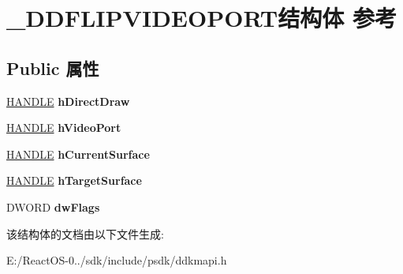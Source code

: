 \hypertarget{struct___d_d_f_l_i_p_v_i_d_e_o_p_o_r_t}{}\section{\+\_\+\+D\+D\+F\+L\+I\+P\+V\+I\+D\+E\+O\+P\+O\+R\+T结构体 参考}
\label{struct___d_d_f_l_i_p_v_i_d_e_o_p_o_r_t}
\subsection*{Public 属性}
\begin{DoxyCompactItemize}
\item 
\mbox{\label{struct___d_d_f_l_i_p_v_i_d_e_o_p_o_r_t_a7405e65bf36679f623654d12df12e3cd}} 
\hyperlink{interfacevoid}{H\+A\+N\+D\+LE} {\bfseries h\+Direct\+Draw}
\item 
\mbox{\label{struct___d_d_f_l_i_p_v_i_d_e_o_p_o_r_t_a215f89a97a57ae1a28efd76b387f9429}} 
\hyperlink{interfacevoid}{H\+A\+N\+D\+LE} {\bfseries h\+Video\+Port}
\item 
\mbox{\label{struct___d_d_f_l_i_p_v_i_d_e_o_p_o_r_t_a7bf84f72ba8c21698b8db5e224075366}} 
\hyperlink{interfacevoid}{H\+A\+N\+D\+LE} {\bfseries h\+Current\+Surface}
\item 
\mbox{\label{struct___d_d_f_l_i_p_v_i_d_e_o_p_o_r_t_a1a6eabc3275b48524668d923c73f5e07}} 
\hyperlink{interfacevoid}{H\+A\+N\+D\+LE} {\bfseries h\+Target\+Surface}
\item 
\mbox{\label{struct___d_d_f_l_i_p_v_i_d_e_o_p_o_r_t_a3b8628f730c161558606c79a08528444}} 
D\+W\+O\+RD {\bfseries dw\+Flags}
\end{DoxyCompactItemize}


该结构体的文档由以下文件生成\+:\begin{DoxyCompactItemize}
\item 
E\+:/\+React\+O\+S-\/0../sdk/include/psdk/ddkmapi.\+h\end{DoxyCompactItemize}
